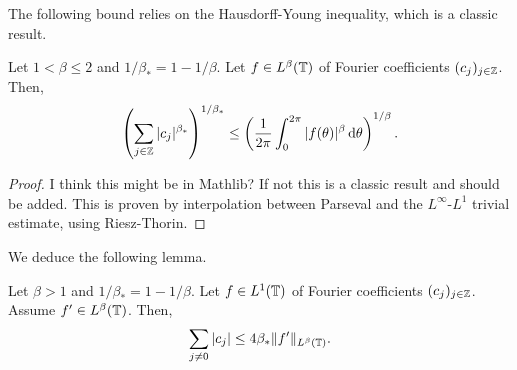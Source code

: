 The following bound relies on the Hausdorff-Young inequality, which is a classic result.

\begin{theorem}
  \label{thm:hausdorff_young}
  Let $1 < \beta \leq 2$ and $1/\beta_* = 1 - 1/\beta$.
  Let $f \in L^\beta(\mathbb{T})$ of Fourier coefficients $(c_j)_{j \in \mathbb{Z}}$.
  Then,
  \begin{equation*}
    \left(\sum_{j \in \mathbb{Z}} |c_j|^{\beta_*} \right)^{1/\beta_*}
    \leq \left(\frac{1}{2 \pi} \int_0^{2 \pi} |f(\theta)|^\beta \, \mathrm{d} \theta\right)^{1/\beta}.
  \end{equation*}
\end{theorem}

\begin{proof}
  I think this might be in Mathlib? If not this is a classic result and should be added.
  This is proven by interpolation between Parseval and the $L^\infty$-$L^1$ trivial estimate,
  using Riesz-Thorin.
\end{proof}

We deduce the following lemma.

\begin{lemma}
  \label{lem:Zygmund}
  Let $\beta > 1$ and $1/\beta_* = 1-1/\beta$.
  Let $f \in L^1(\mathbb{T})$ of Fourier coefficients $(c_j)_{j \in \mathbb{Z}}$.
  Assume $f' \in L^\beta(\mathbb{T})$.
  Then,
  \begin{equation*}
    \sum_{j \neq 0} |c_j| \leq 4 \beta_* \|f' \|_{L^\beta(\mathbb{T})}.
  \end{equation*}
\end{lemma}

